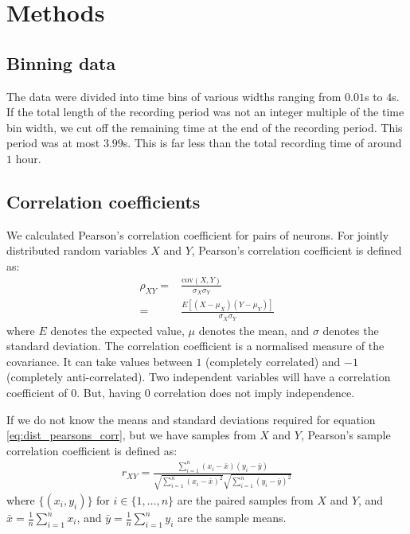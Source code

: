 \documentclass[a4paper,12pt]{article}
\theoremstyle{definition}
\newcommand{\cov}{\text{cov}} %
\begin{document}
\section{Methods}
    \subsection{Binning data}
    The data were divided into time bins of various widths ranging from $0.01$s to $4$s. If the total length of the recording period was not an integer multiple of the time bin width, we cut off the remaining time at the end of the recording period. This period was at most $3.99$s. This is far less than the total recording time of around $1$ hour.

    \subsection{Correlation coefficients}
    We calculated Pearson's correlation coefficient for pairs of neurons. For jointly distributed random variables $X$ and $Y$, Pearson's correlation coefficient is defined as:
    \begin{align}\label{eq:dist_pearsons_corr}
        \rho_{XY} =& \frac{\cov(X,Y)}{\sigma_X \sigma_Y} \\
                  =& \frac{E[(X - \mu_X)(Y - \mu_Y)]}{\sigma_X \sigma_Y}
    \end{align}
    where $E$ denotes the expected value, $\mu$ denotes the mean, and $\sigma$ denotes the standard deviation. The correlation coefficient is a normalised measure of the covariance. It can take values between $1$ (completely correlated) and $-1$ (completely anti-correlated). Two independent variables will have a correlation coefficient of $0$. But, having $0$ correlation does not imply independence.

    If we do not know the means and standard deviations required for equation \ref{eq:dist_pearsons_corr}, but we have samples from $X$ and $Y$, Pearson's sample correlation coefficient is defined as:
    \begin{align}
        r_{XY} = \frac{\sum_{i=1}^n (x_i - \bar{x})(y_i - \bar{y})}{\sqrt{\sum_{i=1}^n (x_i - \bar{x})^2}\sqrt{\sum_{i=1}^n (y_i - \bar{y})^2}}
    \end{align}
    where $\lbrace (x_i, y_i) \rbrace$ for $i \in \lbrace 1, \dots, n \rbrace$ are the paired samples from $X$ and $Y$, and $\bar{x} = \frac{1}{n}\sum_{i=1}^n x_i$, and $\bar{y} = \frac{1}{n}\sum_{i=1}^n y_i$ are the sample means.
\end{document}
